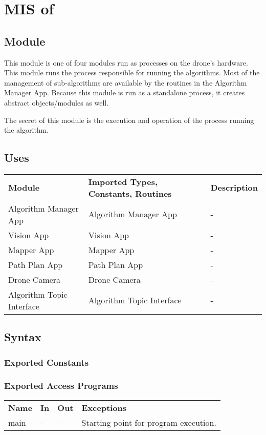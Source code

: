 \documentclass[12pt, titlepage]{article}
\begin{document}
\section{MIS of } \label{MIS_ALGO_MAIN} 
\subsection{Module}
This module is one of four modules run as processes on the drone's hardware. This module runs the process responsible for running the algorithms. Most of the management of sub-algorithms are available by the routines in the Algorithm Manager App. Because this module is run as a standalone process, it creates abstract objects/modules as well.

The secret of this module is the execution and operation of the process running the algorithm.   
\subsection{Uses}
\begin{center}
\begin{tabular}{p{2 cm} p{5cm} p{6.5cm} } 
\hline
\textbf{Module} & \textbf{Imported Types, Constants, Routines} & \textbf{Description} \\
Algorithm Manager App & Algorithm Manager App & - \\
Vision App & Vision App & - \\
Mapper App & Mapper App & - \\
Path Plan App & Path Plan App & - \\
Drone Camera & Drone Camera & - \\
Algorithm Topic Interface & Algorithm Topic Interface & - \\
\hline
\hline
\end{tabular}
\end{center}
\subsection{Syntax}
\subsubsection{Exported Constants}
\subsubsection{Exported Access Programs}
\begin{center}
\begin{tabular}{p{3.5cm} p{2.5cm} p{2.5cm} p{5cm}}
\hline
\textbf{Name} & \textbf{In} & \textbf{Out} & \textbf{Exceptions} \\
main & - & - & Starting point for program execution. \\
\hline
\hline
\end{tabular}
\end{center}
\end{document}
